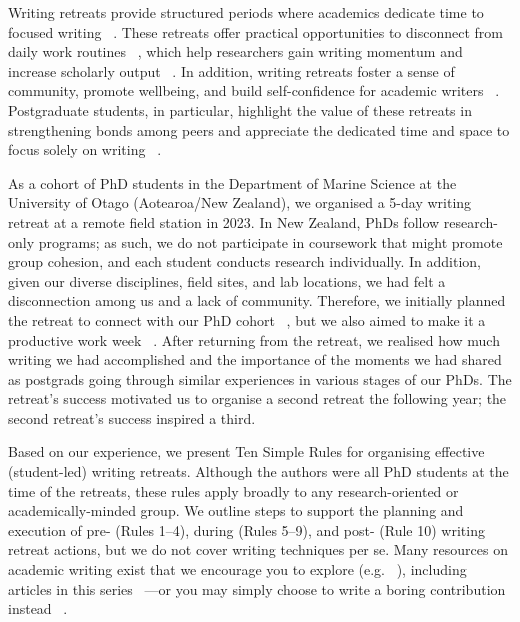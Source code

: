 \documentclass[10pt,letterpaper]{article}
\begin{document}
Writing retreats provide structured periods where academics dedicate time to focused writing ~\cite{mcgrail2006, murray2009}. These retreats offer practical opportunities to disconnect from daily work routines ~\cite{murray2013, tremblay2021}, which help researchers gain writing momentum and increase scholarly output ~\cite{mcgrail2006, kornhaber2016}. In addition, writing retreats foster a sense of community, promote wellbeing, and build self-confidence for academic writers ~\cite{kornhaber2016, eardley2021, tremblay2021}. Postgraduate students, in particular, highlight the value of these retreats in strengthening bonds among peers and appreciate the dedicated time and space to focus solely on writing ~\cite{kornhaber2016, papen2018, tremblay2021, bojovic2024}.

As a cohort of PhD students in the Department of Marine Science at the University of Otago (Aotearoa/New Zealand), we organised a 5-day writing retreat at a remote field station in 2023. In New Zealand, PhDs follow research-only programs; as such, we do not participate in coursework that might promote group cohesion, and each student conducts research individually. In addition, given our diverse disciplines, field sites, and lab locations, we had felt a disconnection among us and a lack of community. Therefore, we initially planned the retreat to connect with our PhD cohort ~\cite{omeara2017, bernery2022}, but we also aimed to make it a productive work week ~\cite{mcgrail2006, kornhaber2016}. After returning from the retreat, we realised how much writing we had accomplished and the importance of the moments we had shared as postgrads going through similar experiences in various stages of our PhDs. The retreat's success motivated us to organise a second retreat the following year; the second retreat's success inspired a third.

Based on our experience, we present Ten Simple Rules for organising effective (student-led) writing retreats. Although the authors were all PhD students at the time of the retreats, these rules apply broadly to any research-oriented or academically-minded group. We outline steps to support the planning and execution of pre- (Rules 1--4), during (Rules 5--9), and post- (Rule 10) writing retreat actions, but we do not cover writing techniques per se. Many resources on academic writing exist that we encourage you to explore (e.g. ~\cite{turbek2016, hotaling2020, carter2020, cargill2021}), including articles in this series ~\cite{weinberger2015, mensh2017, peterson2018}---or you may simply choose to write a boring contribution instead ~\cite{sand2007}.
\end{document}
